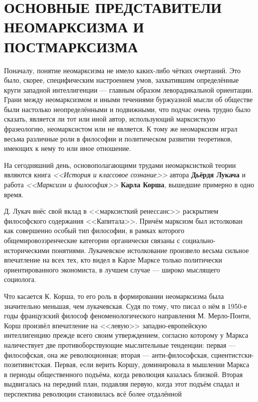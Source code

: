 \section[Основные представители неомарксизма и постмарксизма]
{ОСНОВНЫЕ ПРЕДСТАВИТЕЛИ \\ НЕОМАРКСИЗМА И ПОСТМАРКСИЗМА}

Поначалу, понятие неомарксизма не имело каких-либо чётких очертаний. Это было,
скорее, специфическим настроением умов, захватившим определённые круги западной
интеллигенции --- главным образом леворадикальной ориентации. Грани между
неомарксизмом и иными течениями буржуазной мысли об обществе были настолько
неопределёнными и подвижными, что подчас очень трудно было сказать, является ли
тот или иной автор, использующий марксисткую фразеологию, неомарксистом или
не является. К тому же неомарксизм играл весьма различные роли в философии
и политическом развитии теоретиков, имеющих к нему то или иное отношение.

На сегодняшний день, основополагающими трудами неомарксисткой теории являются
книга \textit{<<История и классовое сознание>>} автора \textbf{Дьёрдя Лукача} и
работа \textit{<<Марксизм и философия>>} \textbf{Карла Корша}, вышедшие примерно
в одно время.

Д. Лукач внёс свой вклад в <<марксисткий ренессанс>> раскрытием философского
содержания <<Капитала>>. Причём марксизм был истолкован как совершенно особый
тип философии, в рамках которого общемировоззренческие категории органически
связаны с социально-историческими понятиями.
Лукачевское истолкование произвело весьма сильное впечатление на всех тех, кто видел
в Карле Марксе только политически ориентированного экономиста, в лучшем случае ---
широко мыслящего социолога.

Что касается К. Корша, то его роль в формировании неомарксизма была
значительно меньшая, чем лукачевская. Судя по тому, что писал о нём в 1950-е годы
французский философ феноменологического направления М. Мерло-Понти, Корш произвёл
впечатление на <<левую>> западно-европейскую интеллигенцию прежде всего своим
утверждением, согласно которому у Маркса наличествует две противоборствующие
мыслительные тенденции: первая --- философская, она же революционная; вторая ---
анти-философская, сциентистски-позитивистская. Первая, если верить Коршу,
доминировала в мышлении Маркса в периоды общественного подъёма, когда революция
казалась близкой. Вторая выдвигалась на передний план, подавляя первую, когда этот
подъём спадал и перспектива революции становилась всё более отдалённой

